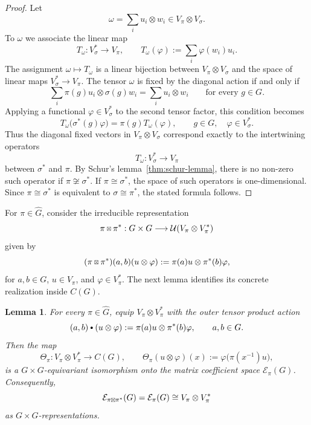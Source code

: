 \documentclass[11pt,showkeys]{amsart}
\newcommand{\sboxtimes}
{\mathbin{\vcenter{\hbox{\scalebox{0.65}{$\boxtimes$}}}}}
\newtheorem{lemma}[theorem]{Lemma}
\newcommand{\hbullet}{\mathbin{\vcenter{\hbox{\scalebox{0.7}{$\bullet$}}}}}
\begin{document}
\begin{proof}
Let
\[
        \omega
        =
        \sum_i u_i\otimes w_i
        \in V_\pi\otimes V_\sigma.
\]
To \(\omega\) we associate the linear map
\[
        T_\omega:V_\sigma^*\longrightarrow V_\pi,
        \qquad
        T_\omega(\varphi)
        :=
        \sum_i\varphi(w_i)u_i.
\]
The assignment \(\omega\mapsto T_\omega\) is a linear bijection between
\(V_\pi\otimes V_\sigma\) and the space of linear maps
\(V_\sigma^*\to V_\pi\).
The tensor \(\omega\) is fixed by the diagonal action if and only if
\[
        \sum_i\pi(g)u_i\otimes\sigma(g)w_i
        =
        \sum_i u_i\otimes w_i
        \qquad
        \text{for every }g\in G.
\]
Applying a functional \(\varphi\in V_\sigma^*\) to the second tensor
factor, this condition becomes
\[
        T_\omega\bigl(\sigma^*(g)\varphi\bigr)
        =
        \pi(g)T_\omega(\varphi),
        \qquad
        g\in G,\quad \varphi\in V_\sigma^*.
\]
Thus the diagonal fixed vectors in \(V_\pi\otimes V_\sigma\)
correspond exactly to the intertwining operators
\[
        T_\omega:V_\sigma^*\longrightarrow V_\pi
\]
between \(\sigma^*\) and \(\pi\).
By Schur's lemma~\ref{thm:schur-lemma}, there is no non-zero such operator if
\(\pi\not\cong\sigma^*\). If \(\pi\cong\sigma^*\), the space of such
operators is one-dimensional. Since
\(\pi\cong\sigma^*\) is equivalent to \(\sigma\cong\pi^*\), the stated
formula follows.
\end{proof}


For \(\pi\in\widehat G\), consider the irreducible representation
\[
        \pi\sboxtimes\pi^*
        :
        G\times G
        \longrightarrow
        \mathcal U(V_\pi\otimes V_\pi^*)
\]
given by
\[
        (\pi\sboxtimes\pi^*)(a,b)(u\otimes\varphi)
        :=
        \pi(a)u\otimes\pi^*(b)\varphi,
\]
for \(a,b\in G\), \(u\in V_\pi\), and
\(\varphi\in V_\pi^*\). The next lemma identifies its concrete
realization inside \(C(G)\).


\begin{lemma}
\label{lem:biregular-matrix-coefficients}
For every \(\pi\in\widehat G\), equip
\(V_\pi\otimes V_\pi^*\) with the outer tensor product action
\[
    (a,b)\hbullet(u\otimes\varphi)
    :=
    \pi(a)u\otimes\pi^*(b)\varphi,
    \qquad a,b\in G.
\]
Then the map
\[
    \Theta_\pi:V_\pi\otimes V_\pi^*
    \longrightarrow C(G),
    \qquad
    \Theta_\pi(u\otimes\varphi)(x)
    :=
    \varphi\bigl(\pi(x^{-1})u\bigr),
\]
is a \(G\times G\)-equivariant isomorphism onto the matrix
coefficient space \(\mathcal E_\pi(G)\). Consequently,
\[
    \mathcal E_{\pi\sboxtimes\pi^*}(G)
    =
    \mathcal E_\pi(G)
    \cong
    V_\pi\otimes V_\pi^*
\]
as \(G\times G\)-representations.
\end{lemma}
\end{document}
